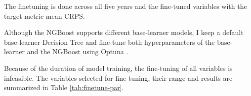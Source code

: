 \documentclass[runningheads]{llncs}
\begin{document}
    The finetuning is done across all five years and the fine-tuned variables with the target metric mean CRPS.

    Although the NGBoost supports different base-learner models, I keep a default base-learner Decision Tree and fine-tune both hyperparameters of the base-learner and the NGBoost using Optuna \cite{akiba2019optuna}.

    Because of the duration of model training, the fine-tuning of all variables is infeasible. The variables selected for fine-tuning, their range and results are summarized in Table \ref{tab:finetune-par}.

    \begin{table}[]


\end{table}
\end{document}
